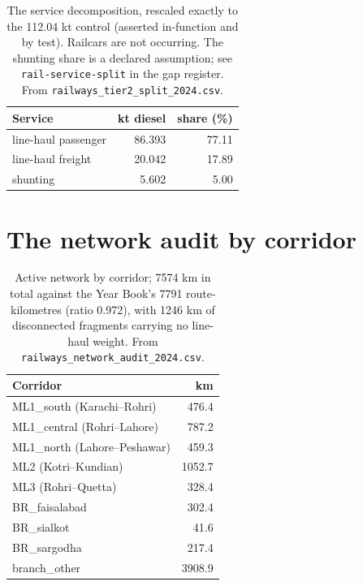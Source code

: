 \documentclass[5p,times,authoryear]{elsarticle}
\begin{document}
\begin{table}[htbp]
\centering
\footnotesize
\begin{tabular}{@{}lrr@{}}
\toprule
\textbf{Service} & \textbf{kt diesel} & \textbf{share (\%)} \\
\midrule
line-haul passenger & 86.393 & 77.11 \\
line-haul freight   & 20.042 & 17.89 \\
shunting            &  5.602 &  5.00 \\
\bottomrule
\end{tabular}
\caption{The service decomposition, rescaled exactly to the \num{112.04} kt control
(asserted in-function and by test). Railcars are not occurring. The shunting share is a
declared assumption; see \texttt{rail-service-split} in the gap register. From
\texttt{railways\_tier2\_split\_2024.csv}.}
\label{tab:tier2}
\end{table}

\section{The network audit by corridor}

\begin{table}[htbp]
\centering
\footnotesize
\begin{tabular}{@{}lr@{}}
\toprule
\textbf{Corridor} & \textbf{km} \\
\midrule
ML1\_south (Karachi--Rohri)        &  476.4 \\
ML1\_central (Rohri--Lahore)       &  787.2 \\
ML1\_north (Lahore--Peshawar)      &  459.3 \\
ML2 (Kotri--Kundian)               & 1052.7 \\
ML3 (Rohri--Quetta)                &  328.4 \\
BR\_faisalabad                     &  302.4 \\
BR\_sialkot                        &   41.6 \\
BR\_sargodha                       &  217.4 \\
branch\_other                      & 3908.9 \\
\bottomrule
\end{tabular}
\caption{Active network by corridor; \num{7574} km in total against the Year Book's
\num{7791} route-kilometres (ratio \num{0.972}), with \num{1246} km of disconnected
fragments carrying no line-haul weight. From \texttt{railways\_network\_audit\_2024.csv}.}
\label{tab:network}
\end{table}
\end{document}
